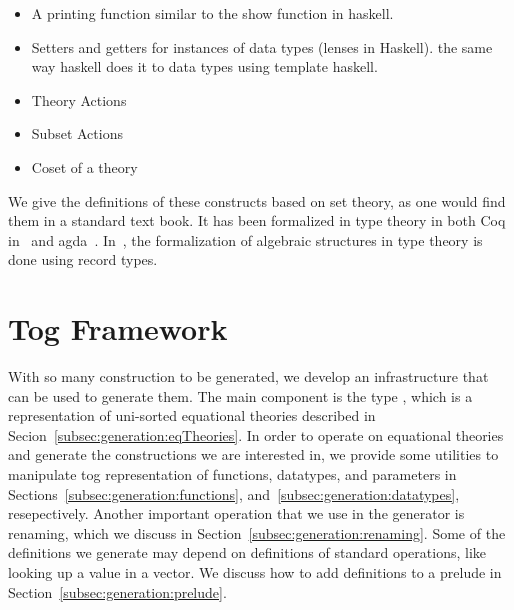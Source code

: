 \begin{itemize}
\begin{itemize}
    \end{itemize}
    \item A printing function similar to the show function in haskell. 
    \item Setters and getters for instances of data types (lenses in Haskell). the same way haskell does it to data types using template haskell. 
    \item Theory Actions 
    \item Subset Actions
    \item Coset of a theory 
\end{itemize} 
We give the definitions of these constructs based on set theory, as one would find them in a standard text book. It has been formalized in type theory in  both Coq in~\cite{capretta99, Spitters2010} and agda~\cite{Gunther2018Agda}. In~\cite{capretta99}, the formalization of algebraic structures in type theory is done using record types. 

\section{Tog Framework}
\label{sec:togFamework}
With so many construction to be generated, we develop an infrastructure that can be used to generate them. The main component is the type , which is a representation of uni-sorted equational theories described in Secion~\ref{subsec:generation:eqTheories}. 
In order to operate on equational theories and generate the constructions we are interested in, we provide some utilities to manipulate tog representation of functions, datatypes, and parameters in Sections~\ref{subsec:generation:functions}, and~\ref{subsec:generation:datatypes}, resepectively. 
Another important operation that we use in the generator is renaming, which we discuss in Section~\ref{subsec:generation:renaming}. Some of the definitions we generate may depend on definitions of standard operations, like looking up a value in a vector. We discuss how to add definitions to a prelude in Section~\ref{subsec:generation:prelude}. 



